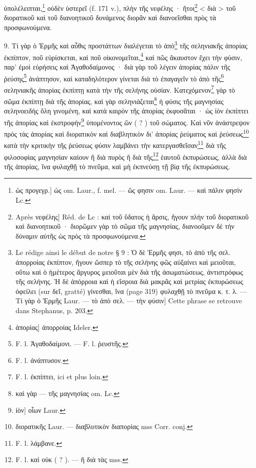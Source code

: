 \documentclass[landscape, a4paper, 11pt, oneside, polutonikogreek, french]{article}
\begin{document}
ὑπολέλειπται,\footnote{ὡς προγεγρ.] ὡς om. Laur., f. mel. --- ὥς φησιν om. Laur. --- καὶ πάλιν φησὶν Lc.} οὐδὲν ὑστερεῖ (f. 171 v.), πλὴν τῆς νεφέλης · ἤτοι\footnote{Après νεφέλης] Réd. de Lc : καὶ τοῦ ὕδατος ἡ ἄρσις, ἤγουν πλὴν τοῦ διορατικοῦ καὶ διανοητικοῦ · διορῶμεν γὰρ τὸ σῶμα τῆς μαγνησίας, διανοοῦμεν δὲ τὴν δύναμιν αὐτῆς ὡς πρὸς τὰ προσφωνούμενα.} < διὰ > τοῦ διορατικοῦ καὶ τοῦ διανοητικοῦ δυνάμενος διορᾶν καὶ διανοεῖσθαι πρὸς τὰ προσφωνούμενα.

9. Τί γὰρ ὁ Ἑρμῆς καὶ αὖθις προστάττων διαλέγεται τὸ ἀπὸ\footnote{Le rédige ainsi le début de notre § 9 : Ὁ δὲ Ἑρμῆς φησι, τὸ ἀπὸ τῆς σελ. ἀπορροίας ἐκπίπτον, ἤγουν ὥσπερ τὸ τῆς σελήνης φῶς αὐξαίνει καὶ μειοῦται, οὕτω καὶ ὁ ἡμέτερος ἄργυρος μειοῦται μὲν διὰ τῆς ἀσωματώσεως, ἀντιστρόφως τῆς σελήνης. Ἡ δὲ ἀπόρροια καὶ ἡ εἴσροια διὰ μακρᾶς καὶ μετρίας ἐκπυρώσεως ὀφείλει (sur δεῖ, gratté) γίνεσθαι, ἵνα (page 319) φυλαχθῇ τὸ πνεῦμα κ. τ. λ. --- Τί γὰρ ὁ Ἑρμῆς Laur. --- τὸ ἀπὸ σελ. --- τὴν φύσιν] Cette phrase se retrouve dans Stephanus, p. 203.} τῆς σεληνιακῆς ἀπορίας ἐκπίπτον, ποῦ εὑρίσκεται, καὶ ποῦ οἰκονομεῖται,\footnote{ἀπορίας] ἀπορροίας Ideler.} καὶ πῶς ἄκαυστον ἔχει τὴν φύσιν, παρ' ἐμοὶ εὑρήσεις καὶ Ἀγαθοδαίμονος · διὰ γὰρ τοῦ λέγειν ἀπορίας πάλιν τῆς ῥεύσης\footnote{F. l. Ἀγαθοδαίμονι. --- F. l. ῥευστῆς.} ἀνάπτησον, καὶ καταδηλότερον γίνεται διὰ τὸ ἐπαγαγεῖν τὸ ἀπὸ τῆς\footnote{F. l. ἀνάπτυσον.} σεληνιακῆς ἀπορίας ἐκπίπτῃ κατὰ τὴν τῆς σελήνης οὐσίαν. Κατεχόμενον\footnote{F. l. ἐκπίπτει, ici et plus loin.} γὰρ τὸ σῶμα ἐκπίπτῃ διὰ τῆς ἀπορίας, καὶ γὰρ σεληνιάζεται\footnote{καὶ γὰρ --- τῆς μαγνησίας om. Lc.} ἡ φύσις τῆς μαγνησίας σεληνοειδὴς ὅλη γινομένη, καὶ κατὰ καιρὸν τῆς ἀπορίας ἐκφυσᾶται · ὡς ἰὸν ἐκπίπτει τῆς ἀπορίας καὶ ἐκστροφὴν\footnote{ἰὸν] οἶων Laur.} ὑπομένοντος ὢν ( ? ) τοῦ σώματος. Καὶ νῦν ἀνάστρεψον πρὸς τὰς ἀπορίας καὶ διορατικὸν καὶ διαβλητικὸν δι' ἀπορίας ῥεύματος καὶ ῥεύσεως\footnote{διορατικῆς Laur. --- διαβλυτικὸν διαπορίας mss Corr. conj.} κατὰ τὴν κριτικὴν τῆς ῥεύσεως φύσιν λαμβάνει τὴν κατεργασθεῖσαν\footnote{F. l. λάμβανε.} διὰ τῆς φιλοσοφίας μαγνησίαν καίουν ἢ διὰ πυρὸς ἢ διὰ τῆς\footnote{F. l. καὶ οὐκ ( ? ). --- ἢ διὰ τὰς mss.} ἑαυτοῦ ἐκπυρώσεως, ἀλλὰ διὰ τῆς ἀπορίας, ἵνα φυλαχθῇ τὸ πνεῦμα, καὶ μὴ ἐκπνεύσῃ τῇ βίᾳ τῆς ἐκπυρώσεως.
\end{document}
